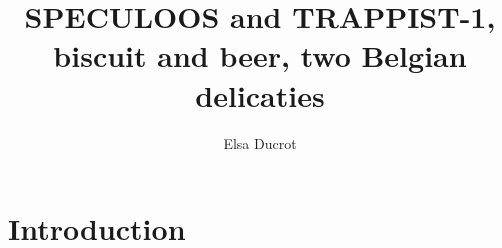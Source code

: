 \documentclass[twocolumn]{aastex631}
\begin{document}
\title{SPECULOOS and TRAPPIST-1, biscuit and beer, two Belgian delicaties}

\author[0000-0000-0000-0000]{Elsa Ducrot}

\begin{abstract}
    \blindtext
\end{abstract}

\section{Introduction}
\Blindtext[4]
\end{document}
